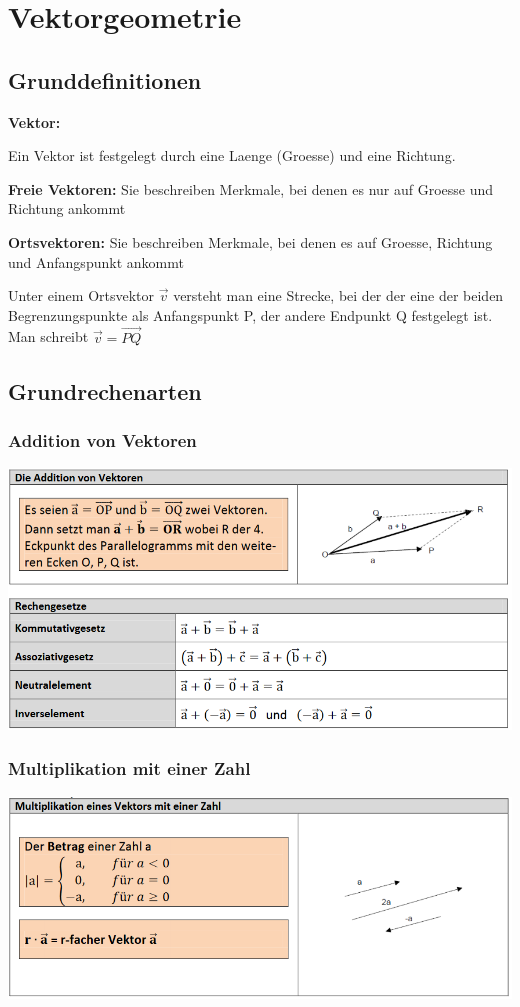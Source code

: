
\section{Vektorgeometrie}
\subsection{Grunddefinitionen}
\textbf{Vektor:}

Ein Vektor ist festgelegt durch eine Laenge (Groesse) und eine Richtung.

\textbf{Freie Vektoren: }
Sie beschreiben Merkmale,
bei denen es nur auf Groesse und Richtung ankommt

\textbf{Ortsvektoren:}
Sie beschreiben Merkmale,
bei denen es auf Groesse, Richtung und Anfangspunkt ankommt

Unter einem Ortsvektor $\vec{v}$  versteht man eine Strecke, bei der der eine der beiden Begrenzungspunkte als Anfangspunkt P, der andere Endpunkt Q festgelegt ist. Man schreibt $\vec{v} = \vec{PQ}$

\subsection{Grundrechenarten}
\subsubsection{Addition von Vektoren}
\includegraphics[scale=0.7]{vec1.PNG}
\subsubsection{Multiplikation mit einer Zahl}
\includegraphics[scale=0.7]{vec3.PNG}

